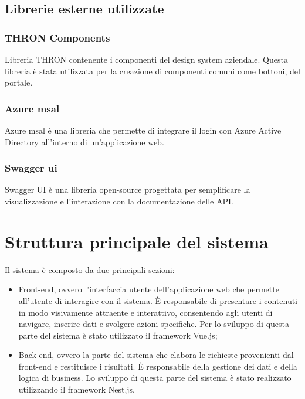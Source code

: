 \subsection{Librerie esterne utilizzate}\label{subsec:librerie-esterne}
\subsubsection{THRON Components}\label{subsubsec:thron-components}
Libreria THRON contenente i componenti del design system aziendale. Questa libreria è stata utilizzata per la creazione di componenti comuni come bottoni, del portale.
\subsubsection{Azure msal}\label{subsubsec:azure-msal}
Azure msal è una libreria che permette di integrare il login con Azure Active Directory all'interno di un'applicazione web.
\subsubsection{Swagger ui}\label{subsubsec:swagger-ui}
Swagger UI è una libreria open-source progettata per semplificare la visualizzazione e l'interazione con la documentazione delle API.

\section{Struttura principale del sistema}
Il sistema è composto da due principali sezioni:
\begin{itemize}
  \item Front-end, ovvero l'interfaccia utente dell'applicazione web che permette all'utente di interagire con il sistema. È responsabile di presentare i contenuti in modo visivamente attraente e interattivo, consentendo agli utenti di navigare, inserire dati e svolgere azioni specifiche. Per lo
  sviluppo di questa parte del sistema è stato utilizzato il framework Vue.js;
  \item Back-end, ovvero la parte del sistema che elabora le richieste provenienti dal front-end e restituisce i risultati. È responsabile della gestione dei dati e della logica di business.
  Lo sviluppo di questa parte del sistema è stato realizzato utilizzando il framework Nest.js. 
\end{itemize}

